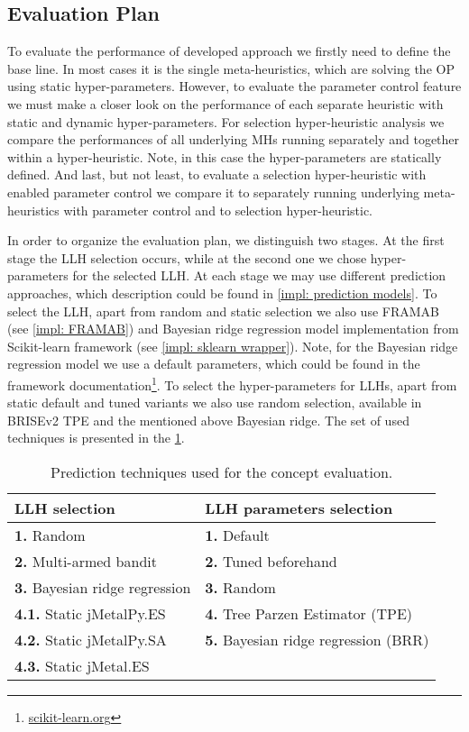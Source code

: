 \subsection{Evaluation Plan}\label{eval:1:plan}
To evaluate the performance of developed approach we firstly need to define the base line. In most cases it is the single meta-heuristics, which are solving the OP using static hyper-parameters. However, to evaluate the parameter control feature we must make a closer look on the performance of each separate heuristic with static and dynamic hyper-parameters. For selection hyper-heuristic analysis we compare the performances of all underlying MHs running separately and together within a hyper-heuristic. Note, in this case the hyper-parameters are statically defined. And last, but not least, to evaluate a selection hyper-heuristic with enabled parameter control we compare it to separately running underlying meta-heuristics with parameter control and to selection hyper-heuristic.

In order to organize the evaluation plan, we distinguish two stages.
At the first stage the LLH selection occurs, while at the second one we chose hyper-parameters for the selected LLH. At each stage we may use different prediction approaches, which description could be found in \cref{impl: prediction models}. To select the LLH, apart from random and static selection we also use FRAMAB (see \cref{impl: FRAMAB}) and Bayesian ridge regression model implementation from Scikit-learn framework (see \cref{impl: sklearn wrapper}). Note, for the Bayesian ridge regression model we use a default parameters, which could be found in the framework documentation\footnote{\href{https://scikit-learn.org/stable/modules/generated/sklearn.linear_model.BayesianRidge.html}{scikit-learn.org}}. To select the hyper-parameters for LLHs, apart from static default and tuned variants we also use random selection, available in BRISEv2 TPE and the mentioned above Bayesian ridge. The set of used techniques is presented in the \cref{eval: concept settings table}.
\begin{table}[h!]
	\centering
	\begin{tabular}{l||l}
		\textbf{LLH selection} & \textbf{LLH parameters selection} \\
		\hline
		\hline
		\textbf{1.} Random & \textbf{1.} Default \\
		\textbf{2.} Multi-armed bandit & \textbf{2.} Tuned beforehand \\
		\textbf{3.} Bayesian ridge regression & \textbf{3.} Random \\
		\textbf{4.1.} Static jMetalPy.ES & \textbf{4.} Tree Parzen Estimator (TPE) \\
		\textbf{4.2.} Static jMetalPy.SA & \textbf{5.} Bayesian ridge regression (BRR) \\
		\textbf{4.3.} Static jMetal.ES & 
	\end{tabular}
	
	\caption{Prediction techniques used for the concept evaluation.}
	\label{eval: concept settings table}
\end{table}


